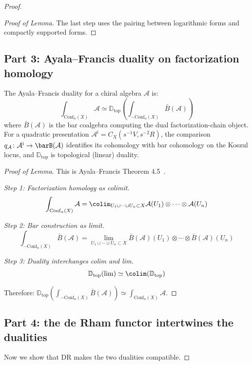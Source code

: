 \begin{proof}
\begin{proof}[Proof of Lemma]
The last step uses the pairing between logarithmic forms and compactly supported forms. \qedhere
\end{proof}

\subsection*{Part 3: Ayala--Francis duality on factorization homology}

\begin{lemma}\label{lem:AF-dual-chiral}
The Ayala--Francis duality for a chiral algebra $\mathcal{A}$ is:
\[\int_{\text{Conf}_n(X)} \mathcal{A} \simeq \mathbb{D}_{\text{top}}\left(\int_{-\text{Conf}_n(X)} \bar{B}(\mathcal{A})\right)\]
where $\bar{B}(\mathcal{A})$ is the bar coalgebra computing the dual
factorization-chain object.  For a quadratic presentation
$\mathcal A^{\mathrm i}=C_X(s^{-1}V,s^{-2}R)$, the comparison
$q_{\mathcal A}\colon\mathcal A^{\mathrm i}\to\barB(\mathcal A)$
identifies its cohomology with bar cohomology on the Koszul locus, and
$\mathbb{D}_{\text{top}}$ is topological (linear) duality.
\end{lemma}

\begin{proof}[Proof of Lemma]
This is Ayala--Francis Theorem 4.5~\cite{AF15}.

\emph{Step 1: Factorization homology as colimit.}
\[\int_{\text{Conf}_n(X)} \mathcal{A} = \colim_{U_1 \sqcup \cdots \sqcup U_n \subset X} \mathcal{A}(U_1) \otimes \cdots \otimes \mathcal{A}(U_n)\]

\emph{Step 2: Bar construction as limit.}
\[\int_{-\text{Conf}_n(X)} \bar{B}(\mathcal{A}) = \lim_{U_1 \sqcup \cdots \sqcup U_n \subset X} \bar{B}(\mathcal{A})(U_1) \otimes \cdots \otimes \bar{B}(\mathcal{A})(U_n)\]

\emph{Step 3: Duality interchanges colim and lim.}
\[\mathbb{D}_{\text{top}}(\lim) \simeq \colim(\mathbb{D}_{\text{top}})\]

Therefore: $\mathbb{D}_{\text{top}}\left(\int_{-\text{Conf}_n(X)} \bar{B}(\mathcal{A})\right) \simeq \int_{\text{Conf}_n(X)} \mathcal{A}$. \qedhere
\end{proof}

\subsection*{Part 4: the de Rham functor intertwines the dualities}

Now we show that DR makes the two dualities compatible.


\end{proof}

